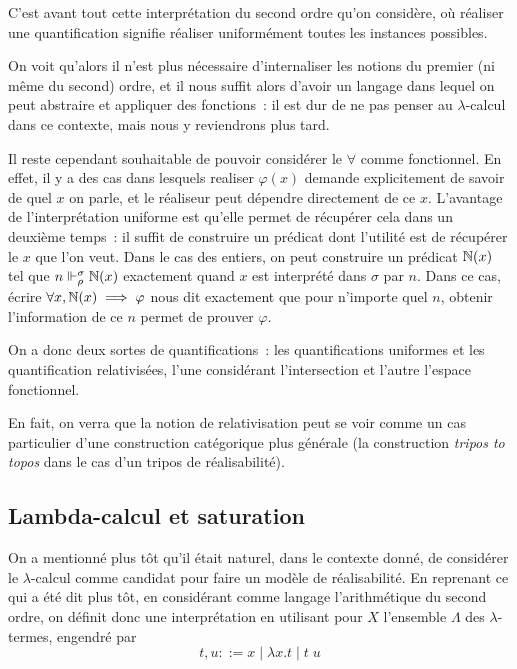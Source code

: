 \documentclass{article}
\begin{document}
C'est avant tout cette interprétation du second ordre qu'on considère, où réaliser une quantification signifie réaliser uniformément toutes les instances possibles.

On voit qu'alors il n'est plus nécessaire d'internaliser les notions du premier (ni même du second) ordre, et il nous suffit alors d'avoir un langage dans lequel on peut abstraire et appliquer des fonctions~: il est dur de ne pas penser au $\lambda$-calcul dans ce contexte, mais nous y reviendrons plus tard.

Il reste cependant souhaitable de pouvoir considérer le $\forall$ comme fonctionnel. En effet, il y a des cas dans lesquels realiser $\varphi(x)$ demande explicitement de savoir de quel $x$ on parle, et le réaliseur peut dépendre directement de ce $x$. L'avantage de l'interprétation uniforme est qu'elle permet de récupérer cela dans un deuxième temps~: il suffit de construire un prédicat dont l'utilité est de récupérer le $x$ que l'on veut. Dans le cas des entiers, on peut construire un prédicat $\mathbb{N}(x)$ tel que $n\Vdash_\rho^\sigma\mathbb{N}(x)$ exactement quand $x$ est interprété dans $\sigma$ par $n$. Dans ce cas, écrire $\forall x, \mathbb{N}(x) \implies \varphi$ nous dit exactement que pour n'importe quel $n$, obtenir l'information de ce $n$ permet de prouver $\varphi$.

On a donc deux sortes de quantifications~: les quantifications uniformes et les quantification relativisées, l'une considérant l'intersection et l'autre l'espace fonctionnel.

En fait, on verra que la notion de relativisation peut se voir comme un cas particulier d'une construction catégorique plus générale (la construction \textit{tripos to topos} dans le cas d'un tripos de réalisabilité).

\subsection{Lambda-calcul et saturation}

On a mentionné plus tôt qu'il était naturel, dans le contexte donné, de considérer le $\lambda$-calcul comme candidat pour faire un modèle de réalisabilité. En reprenant ce qui a été dit plus tôt, en considérant comme langage l'arithmétique du second ordre, on définit donc une interprétation en utilisant pour $X$ l'ensemble $\Lambda$ des $\lambda$-termes, engendré par
\[t,u ::= x\mid \lambda x. t\mid t\;u\]
\end{document}
